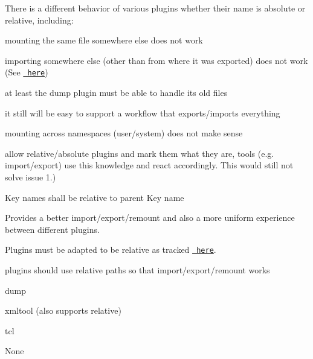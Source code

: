 There is a different behavior of various plugins whether their name is absolute or relative, including\+:


\begin{DoxyEnumerate}
\item mounting the same file somewhere else does not work
\item importing somewhere else (other than from where it was exported) does not work (See \href{https://github.com/ElektraInitiative/libelektra/issues/51}{\texttt{ here}})
\end{DoxyEnumerate}


\begin{DoxyItemize}
\item at least the dump plugin must be able to handle its old files
\end{DoxyItemize}


\begin{DoxyItemize}
\item it still will be easy to support a workflow that exports/imports everything
\item mounting across namespaces (user/system) does not make sense
\end{DoxyItemize}


\begin{DoxyItemize}
\item allow relative/absolute plugins and mark them what they are, tools (e.\+g. import/export) use this knowledge and react accordingly. This would still not solve issue 1.)
\end{DoxyItemize}

Key names shall be relative to parent Key name

Provides a better import/export/remount and also a more uniform experience between different plugins.

Plugins must be adapted to be relative as tracked \href{https://github.com/ElektraInitiative/libelektra/issues/51}{\texttt{ here}}.

plugins should use relative paths so that import/export/remount works


\begin{DoxyItemize}
\item dump
\item xmltool (also supports relative)
\item tcl
\end{DoxyItemize}

None